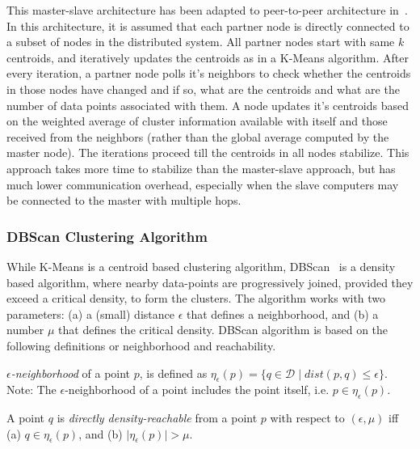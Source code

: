 This master-slave architecture has been adapted to peer-to-peer architecture in~\citep{Bandopadhyay:2006}. In this architecture, it is
assumed that each partner node is directly connected to a subset of nodes in the distributed system. All partner nodes start with same 
$k$ centroids, and iteratively updates the centroids as in a K-Means algorithm. After every iteration, a partner node polls it's 
neighbors to check whether the centroids in those nodes have changed and if so, what are the centroids and what are the number of
data points associated with them. A node updates it's centroids based on the weighted average of cluster information available with 
itself and those received from the neighbors (rather than the global average computed by the master node). The iterations proceed 
till the centroids in all nodes stabilize. This approach takes more time to stabilize than the master-slave approach, but has much
lower communication overhead, especially when the slave computers may be connected to the master with multiple hops.

\subsubsection*{DBScan Clustering Algorithm}

While K-Means is a centroid based clustering algorithm, DBScan~\citep{Ester:1996} is a density based algorithm, where nearby data-points 
are progressively joined, provided they exceed a critical density, to form the clusters. The algorithm works with two parameters:
(a) a (small) distance $\epsilon$ that defines a neighborhood, and 
(b) a number $\mu$ that defines the critical density. 
%
DBScan algorithm is based on the following definitions or neighborhood and reachability. 

\begin{definition} 
	{\em $\epsilon$-neighborhood} of a point $p$, is defined as
	$\eta_{\epsilon}(p) = \{q \in \mathcal{D} \mid dist(p,q) \leq \epsilon\}$.
	Note: The $\epsilon$-neighborhood of a point includes the point itself, i.e. $p \in \eta_{\epsilon}(p)$.
\end{definition}

\begin{definition} 
	A point $q$ is {\em directly density-reachable} from a point $p$ with respect to $(\epsilon, \mu)$ iff
		(a) $q \in \eta_{\epsilon}(p)$, and
		(b) $\mid \eta_{\epsilon}(p) \mid > \mu$.
\end{definition}

